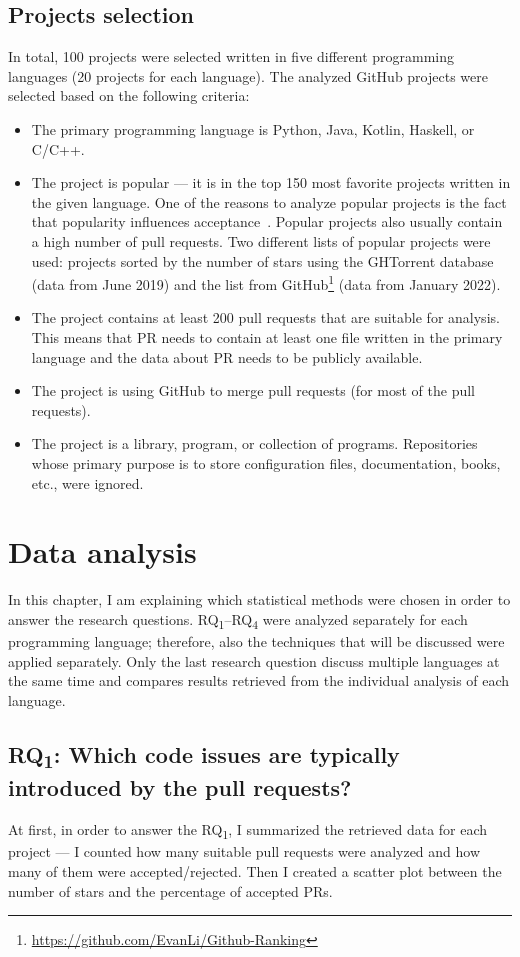 \documentclass[digital,oneside,oldtable,nolof,nolot,nocover]{fithesis4}
\begin{document}
\section{Projects selection}
\label{sec:org9bc4fff}
In total, 100 projects were selected written in five different
programming languages (20 projects for each language).  The analyzed GitHub
projects were selected based on the following criteria:
\begin{itemize}
\item The primary programming language is Python, Java, Kotlin, Haskell, or C/C++.
\item The project is popular --- it is in the top 150 most favorite projects written in the given language.
One of the reasons to analyze popular projects is the fact that popularity influences acceptance~\cite{social}.
Popular projects also usually contain a high number of pull requests.
Two different lists of popular projects were used: projects sorted by the
number of stars using the GHTorrent database (data from  June 2019) and the list from
GitHub\footnote{\url{https://github.com/EvanLi/Github-Ranking}} (data from  January 2022).
\item The project contains at least 200 pull requests that are suitable for analysis.
This means that PR needs to contain at least one file written in the
primary language and the data about PR needs to be publicly available.
\item The project is using GitHub to merge pull requests (for most of the pull requests).
\item The project is a library, program, or collection of programs. Repositories whose primary purpose is
to store configuration files, documentation, books, etc., were ignored.
\end{itemize}
\chapter{Data analysis}
\label{sec:org807b16d}
In this chapter, I am explaining which statistical methods were chosen in
order to answer the research questions. RQ\textsubscript{1}--RQ\textsubscript{4} were
analyzed separately for each programming language; therefore, also the
techniques that will be discussed were applied separately.  Only the last
research question discuss multiple languages at the same time and compares
results retrieved from the individual analysis of each language.
\section{RQ\textsubscript{1}: Which code issues are typically introduced by the pull requests?}
\label{sec:orgea963d7}
At first, in order to answer the RQ\textsubscript{1}, I summarized the retrieved data for each project
--- I counted how many suitable pull requests were analyzed and
how many of them were accepted/rejected. Then I created a scatter plot between the number of
stars and the percentage of accepted PRs.
\end{document}
